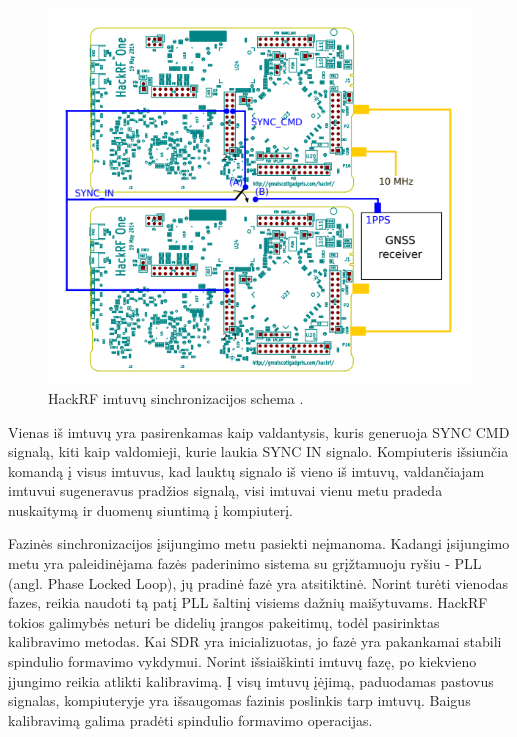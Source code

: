 \documentclass[main.tex]{subfiles}
\begin{document}
\begin{figure}[h]
    \begin{centering}
    \includegraphics[scale=0.8]{drawings/hackrf_sync}
    \par\end{centering}
    \protect\caption{\label{fig:hackrf_sync}HackRF imtuvų sinchronizacijos schema \cite{hackrf_sync}.}
\end{figure}

Vienas iš imtuvų yra pasirenkamas kaip valdantysis, kuris generuoja SYNC CMD signalą,
kiti kaip valdomieji, kurie laukia SYNC IN signalo. Kompiuteris
išsiunčia komandą į visus imtuvus, kad lauktų signalo iš vieno iš imtuvų,
valdančiajam imtuvui sugeneravus pradžios signalą, visi imtuvai vienu metu pradeda
nuskaitymą ir duomenų siuntimą į kompiuterį.

Fazinės sinchronizacijos įsijungimo metu pasiekti neįmanoma. Kadangi įsijungimo metu yra
paleidinėjama fazės paderinimo sistema su grįžtamuoju ryšiu - PLL (angl. Phase Locked Loop), jų pradinė fazė yra atsitiktinė.
Norint turėti vienodas fazes, reikia naudoti tą patį PLL šaltinį visiems
dažnių maišytuvams. HackRF tokios galimybės neturi be didelių įrangos pakeitimų, todėl pasirinktas
kalibravimo metodas.
Kai SDR yra inicializuotas, jo fazė yra pakankamai stabili
spindulio formavimo vykdymui.
Norint išsiaiškinti imtuvų fazę, po kiekvieno įjungimo reikia atlikti kalibravimą.
Į visų imtuvų įėjimą, paduodamas pastovus signalas, kompiuteryje yra išsaugomas
fazinis poslinkis tarp imtuvų. Baigus kalibravimą galima pradėti spindulio
formavimo operacijas.
\end{document}
